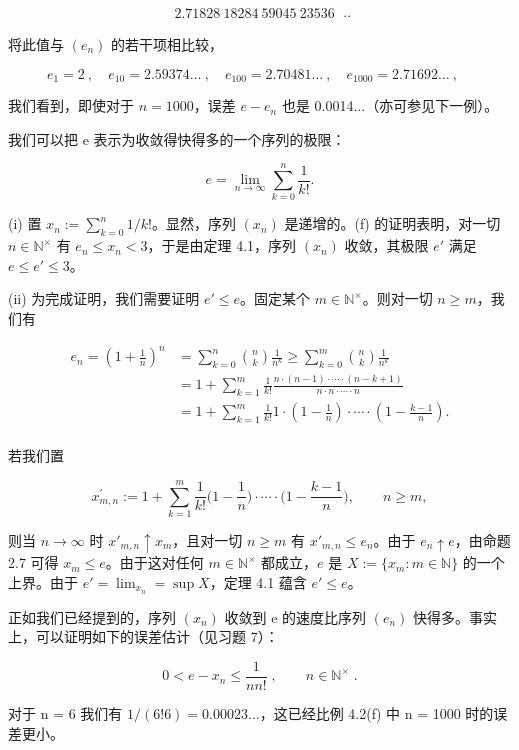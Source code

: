 \begin{example}
\begin{items}
\begin{subitems}
\begin{equation*}
\begin{array}{r}2.71828\ 18284\ 59045\ 23536\ \end{array}..
\end{equation*}

将此值与  $ (e_{n}) $ 的若干项相比较，

\[
e_{1}=2~,\quad e_{10}=2.59374\ldots~,\quad e_{100}=2.70481\ldots~,\quad e_{1000}=2.71692\ldots~,\quad
\]

我们看到，即使对于 $n=1000$，误差 $e-e_n$ 也是 0.0014...（亦可参见下一例）。

\end{subitems}

\item

我们可以把 e 表示为收敛得快得多的一个序列的极限：

\[
e=\lim_{n\to\infty}\sum_{k=0}^{n}\frac{1}{k!}.
\]

\proofhead
(i) 置  $ x_n := \sum_{k=0}^n 1/k! $。显然，序列  $ (x_n) $ 是递增的。(f) 的证明表明，对一切  $ n \in \mathbb{N}^\times $ 有  $ e_n \leq x_n < 3 $，于是由定理 4.1，序列  $ (x_n) $ 收敛，其极限  $ e' $ 满足  $ e \leq e' \leq 3 $。
\end{items}

(ii) 为完成证明，我们需要证明  $ e' \leq e $。固定某个  $ m \in \mathbb{N}^\times $。则对一切  $ n \geq m $，我们有

\begin{equation*}
\begin{aligned}
e_{n}=\left(1+\frac{1}{n}\right)^{n}&=\sum_{k=0}^{n}\binom{n}{k}\frac{1}{n^{k}}\geq\sum_{k=0}^{m}\binom{n}{k}\frac{1}{n^{k}}\\&=1+\sum_{k=1}^{m}\frac{1}{k!}\frac{n\cdot(n-1)\cdot\cdots\cdot(n-k+1)}{n\cdot n\cdot\cdots\cdot n}\\&=1+\sum_{k=1}^{m}\frac{1}{k!}1\cdot\left(1-\frac{1}{n}\right)\cdot\cdots\cdot\left(1-\frac{k-1}{n}\right).\\
\end{aligned}
\end{equation*}

若我们置

\[
x_{m,n}^{\prime}:=1+\sum_{k=1}^{m}\frac{1}{k!}\Big(1-\frac{1}{n}\Big)\cdot\cdots\cdot\Big(1-\frac{k-1}{n}\Big),\qquad n\geq m,
\]

则当  $ n \to \infty $ 时  $ x'_{m,n} \uparrow x_m $，且对一切  $ n \geq m $ 有  $ x'_{m,n} \leq e_n $。由于  $ e_n \uparrow e $，由命题 2.7 可得  $ x_m \leq e $。由于这对任何  $ m \in \mathbb{N}^\times $ 都成立，$ e $ 是  $ X := \{x_m : m \in \mathbb{N}\} $ 的一个上界。由于  $ e' = \lim_{x_n} = \sup X $，定理 4.1 蕴含  $ e' \leq e $。

正如我们已经提到的，序列  $ (x_{n}) $ 收敛到 e 的速度比序列  $ (e_{n}) $ 快得多。事实上，可以证明如下的误差估计（见习题 7）：

\[
0<e-x_{n}\leq\frac{1}{n n!}\;,\qquad n\in\mathbb{N}^\times\;.
\]

对于 n = 6 我们有  $ 1/(6!6) = 0.00023\ldots $，这已经比例 4.2(f) 中 n = 1000 时的误差更小。

\end{example}

